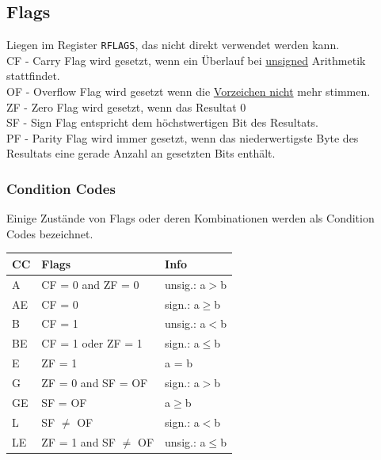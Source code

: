 \documentclass[8pt,landscape,a4paper]{scrartcl}
\begin{document}
\begin{multicols*}{5}
\subsection{Flags}
Liegen im Register \texttt{RFLAGS}, das nicht direkt verwendet werden kann.\\
\textcolor{b}{CF - Carry Flag} wird gesetzt, wenn ein Überlauf bei \underline{unsigned} Arithmetik stattfindet.\\
\textcolor{b}{OF - Overflow Flag} wird gesetzt wenn die \underline{Vorzeichen nicht} mehr stimmen.\\
\textcolor{b}{ZF - Zero Flag} wird gesetzt, wenn das Resultat 0\\
\textcolor{b}{SF - Sign Flag} entspricht dem höchstwertigen Bit des Resultats.\\
\textcolor{b}{PF - Parity Flag} wird immer gesetzt, wenn das niederwertigste Byte des Resultats eine gerade Anzahl an gesetzten Bits enthält.
\subsubsection{Condition Codes}
Einige Zustände von Flags oder deren Kombinationen werden als Condition Codes bezeichnet. 
\begin{center}
	\begin{tabular}{p{.5cm}|p{2.3cm}|p{1.5cm}}
		CC&Flags& Info\\
		\hline
		A&CF = 0 and ZF = 0&unsig.: a$>$b\\
		AE&CF = 0&sign.: a$\geq$b\\
		B&CF = 1& unsig.: a$<$b\\
		BE&CF = 1 oder ZF = 1&sign.: a$\leq$b\\
		E&ZF = 1& a = b\\
		G&ZF = 0 and SF = OF&sign.: a$>$b\\
		GE&SF = OF&a$\geq$b\\
		L&SF $\neq$ OF&sign.: a$<$b\\
		LE&ZF = 1 and SF $\neq$ OF&unsig.: a$\leq$b\\
	\end{tabular}
\end{center}

\end{multicols*}
\end{document}
